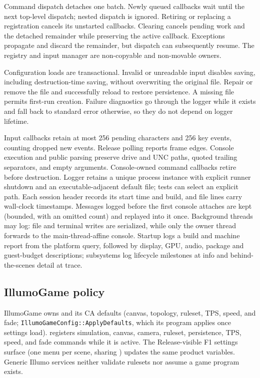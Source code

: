 Command dispatch detaches one batch. Newly queued callbacks wait until the next
top-level dispatch; nested dispatch is ignored. Retiring or replacing a
registration cancels its unstarted callbacks. Clearing cancels pending work and
the detached remainder while preserving the active callback. Exceptions
propagate and discard the remainder, but dispatch can subsequently resume.
The registry and input manager are non-copyable and non-movable owners.

Configuration loads are transactional. Invalid or unreadable input disables
saving, including destruction-time saving, without overwriting the original
file. Repair or remove the file and successfully reload to restore persistence.
A missing file permits first-run creation. Failure diagnostics go through the
logger while it exists and fall back to standard error otherwise, so they do
not depend on logger lifetime.

Input callbacks retain at most 256 pending characters and 256 key events, counting
dropped new events. Release polling reports frame edges. Console execution and
public parsing preserve drive and UNC paths, quoted trailing separators, and
empty arguments. Console-owned command callbacks retire before destruction.
Logger retains a unique process instance with explicit runner shutdown and an
executable-adjacent default file; tests can select an explicit path. Each
session header records its start time and build, and file lines carry
wall-clock timestamps. Messages logged before the first console attaches are
kept (bounded, with an omitted count) and replayed into it once. Background
threads may log: file and terminal writes are serialized, while only the
owner thread forwards to the main-thread-affine console. Startup logs a build
and machine report from the platform  query, followed by
display, GPU, audio, package and guest-budget descriptions; subsystems log
lifecycle milestones at info and behind-the-scenes detail at trace.

\subsection{IllumoGame policy}
IllumoGame owns  and its CA defaults (canvas,
topology, ruleset, TPS, speed, and fade; \texttt{IllumoGameConfig::ApplyDefaults},
which its program applies once settings load). 
registers simulation, canvas, camera, ruleset, persistence, TPS, speed, and
fade commands while it is active. The Release-visible F1 settings surface (one
menu per scene, sharing ) updates the same product
variables. Generic Illumo services neither validate rulesets nor assume a game
program exists.

